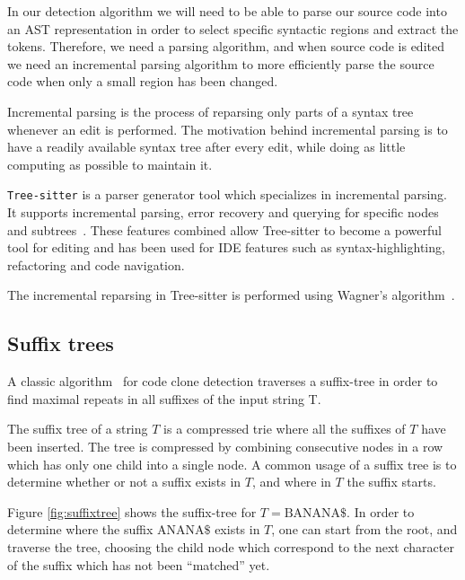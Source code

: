 In our detection algorithm we will need to be able to parse our source code into an AST
representation in order to select specific syntactic regions and extract the tokens.
Therefore, we need a parsing algorithm, and when source code is edited we need an
incremental parsing algorithm to more efficiently parse the source code when only a
small region has been changed.

Incremental parsing is the process of reparsing only parts of a syntax tree whenever an
edit is performed. The motivation behind incremental parsing is to have a readily
available syntax tree after every edit, while doing as little computing as possible to
maintain it.

\verb|Tree-sitter| is a parser generator tool which specializes in incremental parsing. It
supports incremental parsing, error recovery and querying for specific nodes and
subtrees~\cite{treesitter}. These features combined allow Tree-sitter to become a powerful
tool for editing and has been used for IDE features such as syntax-highlighting,
refactoring and code navigation.

The incremental reparsing in Tree-sitter is performed using Wagner's
algorithm~\cite{PracticalAlgorithmsForIncremental}.


\subsection*{Suffix trees}

A classic algorithm~\cite{Zibran_real_time_search, GodeIncrementalCloneDetection} for code
clone detection traverses a suffix-tree in order to find maximal repeats in all suffixes
of the input string T.

The suffix tree of a string $T$ is a compressed trie where all the suffixes of $T$ have been
inserted. The tree is compressed by combining consecutive nodes in a row which has
only one child into a single node. A common usage of a suffix tree is to determine whether
or not a suffix exists in $T$, and where in $T$ the suffix starts.

Figure \ref{fig:suffixtree} shows the suffix-tree for $T=\text{BANANA\$}$. In order to
determine where the suffix $\text{ANANA\$}$ exists in $T$, one can start from the root,
and traverse the tree, choosing the child node which correspond to the next character of
the suffix which has not been ``matched'' yet.

